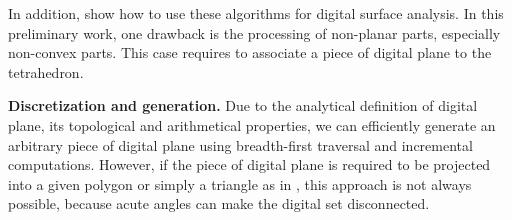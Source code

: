 In addition, \cite{LPRJMIV2017} show how to use these algorithms
for digital surface analysis. In this preliminary work, one drawback is
the processing of non-planar parts, especially non-convex parts. This case
requires to associate a piece of digital plane to the tetrahedron.





\noindent\textbf{Discretization and generation.}
Due to the analytical definition of digital plane, its topological and
arithmetical properties, we can efficiently generate an arbitrary piece
of digital plane using breadth-first traversal and incremental computations.
However, if the piece of digital plane is required to be projected into a
given polygon or simply a triangle as in \cite{LPRJMIV2017}, this approach
is not always possible, because acute angles can make the digital set disconnected. 

